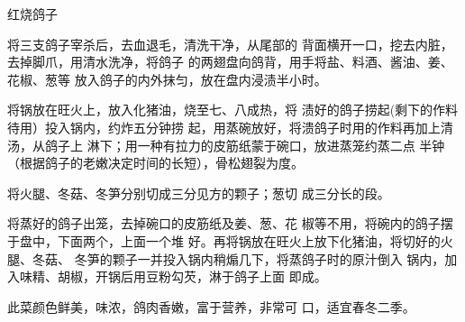 \begin{recipe}{红烧鸽子}

\ingredients



\cooking

\step 	将三支鸽子宰杀后，去血退毛，清洗干净，从尾部的 背面横开一口，挖去内脏，去掉脚爪，用清水洗净，将鸽子 的两翅盘向鸽背，用手将盐、料酒、酱油、姜、花椒、葱等 放入鸽子的内外抹匀，放在盘内浸渍半小时。

\step 	将锅放在旺火上，放入化猪油，烧至七、八成热，将 渍好的鸽子捞起(剩下的作料待用）投入锅内，约炸五分钟捞 起，用蒸碗放好，将溃鸽子时用的作料再加上清汤，从鸽子上 淋下；用一种有拉力的皮筋纸蒙于碗口，放进蒸笼约蒸二点 半钟（根据鸽子的老嫩决定时间的长短），骨松翅裂为度。

\step 	将火腿、冬菇、冬笋分别切成三分见方的颗子；葱切 成三分长的段。

将蒸好的鸽子出笼，去掉碗口的皮筋纸及姜、葱、花 椒等不用，将碗内的鸽子摆于盘中，下面两个，上面一个堆 好。再将锅放在旺火上放下化猪油，将切好的火腿、冬菇、 冬笋的颗子一并投入锅内稍煽几下，将蒸鸽子时的原汁倒入 锅内，加入味精、胡椒，开锅后用豆粉勾芡，淋于鸽子上面 即成。

\notes

此菜颜色鲜美，味浓，鸽肉香嫩，富于营养，非常可 口，适宜春冬二季。

\end{recipe}

